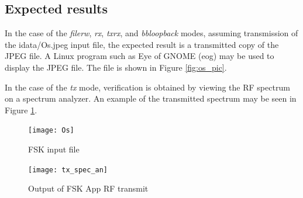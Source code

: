 \subsection{Expected results}
\noindent In the case of the \textit{filerw}, \textit{rx}, \textit{txrx}, and \textit{bbloopback} modes, assuming transmission of the idata/Os.jpeg input file, the expected result is a transmitted copy of the JPEG file. A Linux program such as Eye of GNOME (eog) may be used to display the JPEG file. The file is shown in Figure \ref{fig:os_pic}.\par\medskip
\noindent In the case of the \textit{tx} mode, verification is obtained by viewing the RF spectrum on a spectrum analyzer. An example of the transmitted spectrum may be seen in Figure \ref{fig:tx_spec_an}.\par\medskip
	\begin{figure}[ht]
	 	\centering
	 	\begin{minipage}{.325\textwidth}
			\centering\texttt{[image: Os]}
			\caption{FSK input file}
			\label{fig:os_pic}
		\end{minipage}
	 	\begin{minipage}{.45\textwidth}
			\centering\texttt{[image: tx\_spec\_an]}
			\caption{Output of FSK App RF transmit}
			\label{fig:tx_spec_an}
		\end{minipage}
	\end{figure}
